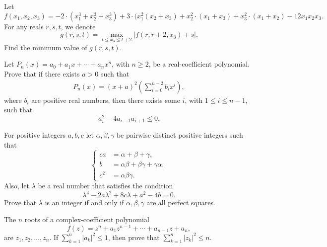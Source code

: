 \begin{question}[name={2002 China TST}]
    Let \[f(x_1,x_2,x_3) = -2 \cdot (x_1^3+x_2^3+x_3^3) + 3 \cdot (x_1^2(x_2+x_3) + x_2^2 \cdot (x_1+x_3) + x_3^2 \cdot ( x_1+x_2 ) - 12x_1x_2x_3.\] For any reals $r,s,t$, we denote \[g(r,s,t)=\max_{t\leq x_3\leq t+2} |f(r,r+2,x_3)+s|.\] Find the minimum value of $g(r,s,t)$.
\end{question}




\begin{question}[name={2002 China TST}]
    Let $P_n(x)=a_0 + a_1x + \cdots + a_nx^n$, with $n \geq 2$, be a real-coefficient polynomial. Prove that if there exists $a > 0$ such that
    \begin{align*}
        P_n(x) = (x + a)^2 \left( \sum_{i=0}^{n-2} b_i x^i \right),
    \end{align*}
    where $b_i$ are positive real numbers, then there exists some $i$, with $1 \leq i \leq n-1$, such that \[a_i^2 - 4a_{i-1}a_{i+1} \leq 0.\]
\end{question}




\begin{question}[name={2002 China TST}]
    For positive integers $a,b,c$ let $ \alpha, \beta, \gamma$ be pairwise distinct positive integers such that
    \[ \begin{cases}{c} \displaystyle a &= \alpha + \beta + \gamma, \\ 
    b &= \alpha \beta + \beta \gamma + \gamma \alpha, \\
    c^2 &= \alpha\beta\gamma. \end{cases} \]
    Also, let $ \lambda$ be a real number that satisfies the condition
    \[\lambda^4 -2a\lambda^2 + 8c\lambda + a^2 - 4b = 0.\]
    Prove that $\lambda$ is an integer if and only if $\alpha, \beta, \gamma$ are all perfect squares.
\end{question}



\begin{question}[name={2003 China TST}]
    The $n$ roots of a complex-coefficient polynomial \[f(z) = z^n + a_1z^{n - 1} + \cdots + a_{n - 1}z + a_n,\] are $z_1, z_2, \dots, z_n$. If $ \sum_{k = 1}^n |a_k|^2 \leq 1$, then prove that $ \sum_{k = 1}^n |z_k|^2 \leq n$.
\end{question}




